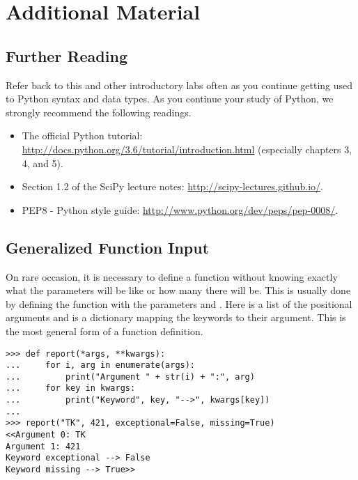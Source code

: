 \newpage

\section*{Additional Material} %

\subsection*{Further Reading} %

Refer back to this and other introductory labs often as you continue getting used to Python syntax and data types.
As you continue your study of Python, we strongly recommend the following readings.
\begin{itemize}
\item The official Python tutorial: \url{http://docs.python.org/3.6/tutorial/introduction.html} (especially chapters 3, 4, and 5).
\item Section 1.2 of the SciPy lecture notes: \url{http://scipy-lectures.github.io/}.
\item PEP8 - Python style guide: \url{http://www.python.org/dev/peps/pep-0008/}.
\end{itemize}

\subsection*{Generalized Function Input} %

On rare occasion, it is necessary to define a function without knowing exactly what the parameters will be like or how many there will be.
This is usually done by defining the function with the parameters  and .
Here  is a list of the positional arguments and  is a dictionary mapping the keywords to their argument.
This is the most general form of a function definition.

\begin{lstlisting}
>>> def report(*args, **kwargs):
...     for i, arg in enumerate(args):
...         print("Argument " + str(i) + ":", arg)
...     for key in kwargs:
...         print("Keyword", key, "-->", kwargs[key])
...
>>> report("TK", 421, exceptional=False, missing=True)
<<Argument 0: TK
Argument 1: 421
Keyword exceptional --> False
Keyword missing --> True>>
\end{lstlisting}

